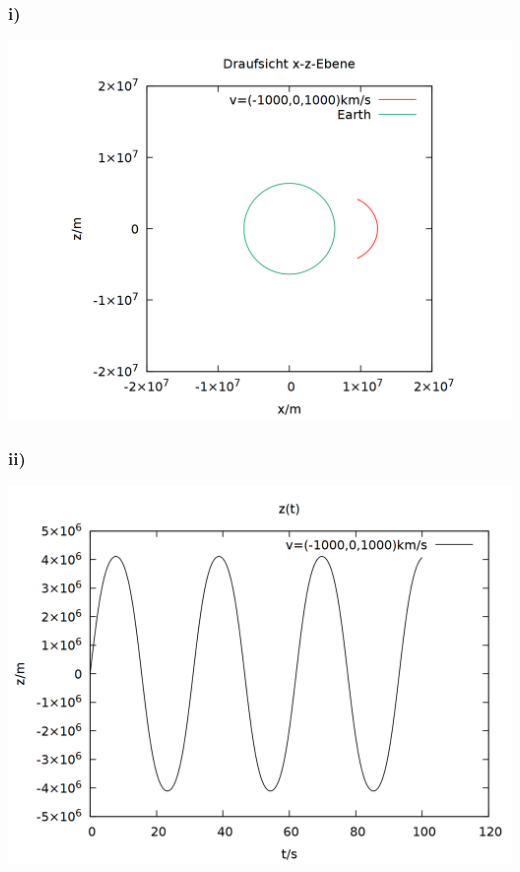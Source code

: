 \documentclass{scrreprt}
\begin{document}
\subsubsection*{i)}
\begin{center}
\includegraphics[scale=0.25]{plot_2_i.png}
\end{center}
\subsubsection*{ii)}
\begin{center}
\includegraphics[scale=0.25]{plot_2_ii.png}
\end{center}
\end{document}
